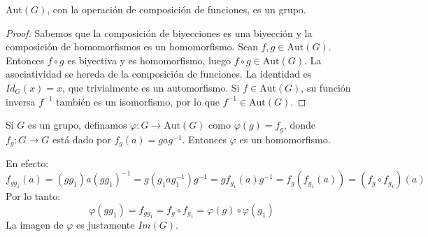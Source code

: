 \begin{obs}
    $\text{Aut}(G)$, con la operación de composición de funciones, es un grupo.
\end{obs}

\begin{proof}
    Sabemos que la composición de biyecciones es una biyección y la composición de homomorfismos es un homomorfismo.
    Sean $f, g \in \text{Aut}(G)$. Entonces $f \circ g$ es biyectiva y es homomorfismo, luego $f \circ g \in \text{Aut}(G)$.
    La asociatividad se hereda de la composición de funciones.
    La identidad es $Id_G(x) = x$, que trivialmente es un automorfismo.
    Si $f \in \text{Aut}(G)$, su función inversa $f^{-1}$ también es un isomorfismo, por lo que $f^{-1} \in \text{Aut}(G)$.
\end{proof}

\begin{eje}
    Si $G$ es un grupo, definamos $\varphi: G \to \text{Aut}(G)$ como $\varphi(g) = f_g$, donde $f_g: G \to G$ está dado por $f_g(a) = gag^{-1}$.
    Entonces $\varphi$ es un homomorfismo.
    
    En efecto:
    \begin{equation*}
        f_{gg_1}(a) = (gg_1)a(gg_1)^{-1} = g(g_1 a g_1^{-1})g^{-1} = g f_{g_1}(a) g^{-1} = f_g(f_{g_1}(a)) = (f_g \circ f_{g_1})(a)
    \end{equation*}
    Por lo tanto:
    \begin{equation*}
        \varphi(gg_1) = f_{gg_1} = f_g \circ f_{g_1} = \varphi(g) \circ \varphi(g_1)
    \end{equation*}
    La imagen de $\varphi$ es justamente $Im(G)$.
\end{eje}


